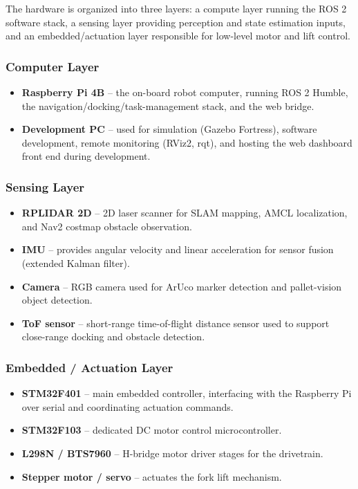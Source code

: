 \documentclass[a4paper, 12pt]{article}
\begin{document}
The hardware is organized into three layers: a compute layer running the
ROS 2 software stack, a sensing layer providing perception and state
estimation inputs, and an embedded/actuation layer responsible for
low-level motor and lift control.

\subsubsection*{Computer Layer}

\begin{itemize}
    \item \textbf{Raspberry Pi 4B} -- the on-board robot computer,
    running ROS 2 Humble, the navigation/docking/task-management stack,
    and the web bridge.
    \item \textbf{Development PC} -- used for simulation (Gazebo
    Fortress), software development, remote monitoring (RViz2, rqt),
    and hosting the web dashboard front end during development.
\end{itemize}

\subsubsection*{Sensing Layer}

\begin{itemize}
    \item \textbf{RPLIDAR 2D} -- 2D laser scanner for SLAM mapping,
    AMCL localization, and Nav2 costmap obstacle observation.
    \item \textbf{IMU} -- provides angular velocity and linear
    acceleration for sensor fusion (extended Kalman filter).
    \item \textbf{Camera} -- RGB camera used for ArUco marker detection
    and pallet-vision object detection.
    \item \textbf{ToF sensor} -- short-range time-of-flight distance
    sensor used to support close-range docking and obstacle detection.
\end{itemize}

\subsubsection*{Embedded / Actuation Layer}

\begin{itemize}
    \item \textbf{STM32F401} -- main embedded controller, interfacing
    with the Raspberry Pi over serial and coordinating actuation
    commands.
    \item \textbf{STM32F103} -- dedicated DC motor control
    microcontroller.
    \item \textbf{L298N / BTS7960} -- H-bridge motor driver stages for
    the drivetrain.
    \item \textbf{Stepper motor / servo} -- actuates the fork lift
    mechanism.
\end{itemize}
\end{document}
